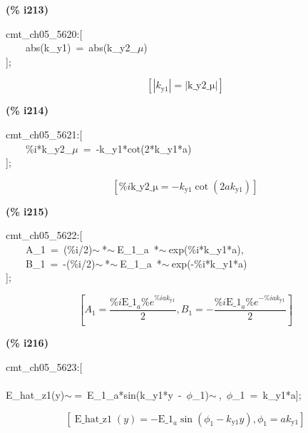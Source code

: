 \documentclass[fleqn]{article}
\begin{document}
\noindent
\begin{minipage}[t]{4.000000em}\color{red}\bfseries
(\% i213)	
\end{minipage}
\begin{minipage}[t]{\textwidth}\color{blue}
cmt\_ch05\_5620:[\\
\ \ \ \ abs(k\_y1)\ =\ abs(k\_y2\_\ensuremath{\mu})\\
];
\end{minipage}
\[\displaystyle \tag{\% o213} 
\left[ \left| {k_{\ensuremath{\mathrm{y1}}}}\right| =\left| \ensuremath{\mathrm{k\_ y2\_ \mu }}\right| \right] \mbox{}
\]


\noindent
\begin{minipage}[t]{4.000000em}\color{red}\bfseries
(\% i214)	
\end{minipage}
\begin{minipage}[t]{\textwidth}\color{blue}
cmt\_ch05\_5621:[\\
\ \ \ \ \%i*k\_y2\_\ensuremath{\mu}\ =\ -k\_y1*cot(2*k\_y1*a)\\
];
\end{minipage}
\[\displaystyle \tag{\% o214} 
\left[ \% i \ensuremath{\mathrm{k\_ y2\_ \mu }}=-{k_{\ensuremath{\mathrm{y1}}}} \cot{\left( 2 a {k_{\ensuremath{\mathrm{y1}}}}\right) }\right] \mbox{}
\]


\noindent
\begin{minipage}[t]{4.000000em}\color{red}\bfseries
(\% i215)	
\end{minipage}
\begin{minipage}[t]{\textwidth}\color{blue}
cmt\_ch05\_5622:[\\
\ \ \ \ A\_1\ =\ (\%i/2)\ensuremath{\sim\ }*\ensuremath{\sim\ }E\_1\_a\ *\ensuremath{\sim\ }exp(\%i*k\_y1*a),\\
\ \ \ \ B\_1\ =\ -(\%i/2)\ensuremath{\sim\ }*\ensuremath{\sim\ }E\_1\_a\ *\ensuremath{\sim\ }exp(-\%i*k\_y1*a)\\
];
\end{minipage}
\[\displaystyle \tag{\% o215} 
\left[ {A_1}=\frac{\% i {{\ensuremath{\mathrm{E\_ 1}}}_a} {{\% e}^{\% i a {k_{\ensuremath{\mathrm{y1}}}}}}}{2}\operatorname{,}{B_1}=-\frac{\% i {{\ensuremath{\mathrm{E\_ 1}}}_a} {{\% e}^{-\% i a {k_{\ensuremath{\mathrm{y1}}}}}}}{2}\right] \mbox{}
\]


\noindent
\begin{minipage}[t]{4.000000em}\color{red}\bfseries
(\% i216)	
\end{minipage}
\begin{minipage}[t]{\textwidth}\color{blue}
cmt\_ch05\_5623:[\\
\\
E\_hat\_z1(y)\ensuremath{\sim\ }=\ E\_1\_a*sin(k\_y1*y\ -\ \ensuremath{\phi}\_1)\ensuremath{\sim\ },\ \ensuremath{\phi}\_1\ =\ k\_y1*a];
\end{minipage}
\[\displaystyle \tag{\% o216} 
\left[ \operatorname{E\_ hat\_ z1}(y)=-{{\ensuremath{\mathrm{E\_ 1}}}_a} \sin{\left( {{\phi }_1}-{k_{\ensuremath{\mathrm{y1}}}} y\right) }\operatorname{,}{{\phi }_1}=a {k_{\ensuremath{\mathrm{y1}}}}\right] \mbox{}
\]
\end{document}
